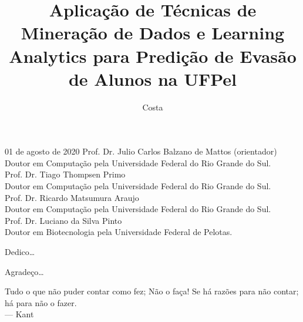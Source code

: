 \documentclass[diss,capa]{texufpel}
\title{Aplicação de Técnicas de Mineração de Dados e Learning Analytics para Predição de Evasão de Alunos na UFPel}
\author{Costa}{Alexandre Gomes da}
\begin{document}
\maketitle 

\sloppy

\fichacatalografica

\begin{aprovacao}{01 de agosto de 2020} %
\noindent Prof. Dr. Julio Carlos Balzano de Mattos (orientador)\\
Doutor em Computação pela Universidade Federal do Rio Grande do Sul.\\[1cm]

\noindent Prof. Dr. Tiago Thompsen Primo\\
Doutor em Computação pela Universidade Federal do Rio Grande do Sul.\\[1cm]

\noindent Prof. Dr. Ricardo Matsumura Araujo\\
Doutor em Computação pela Universidade Federal do Rio Grande do Sul.\\[1cm]

\noindent Prof. Dr. Luciano da Silva Pinto\\
Doutor em Biotecnologia pela Universidade Federal de Pelotas.
\end{aprovacao}

\begin{dedicatoria}
  Dedico\ldots 
\end{dedicatoria}

\begin{agradecimentos}
  Agradeço\ldots 
\end{agradecimentos}

\begin{epigrafe}
  Tudo o que não puder contar como fez; Não o faça! Se há razões para não contar; há para não o fazer.\\
  {\sc --- Kant}
\end{epigrafe}
\end{document}
